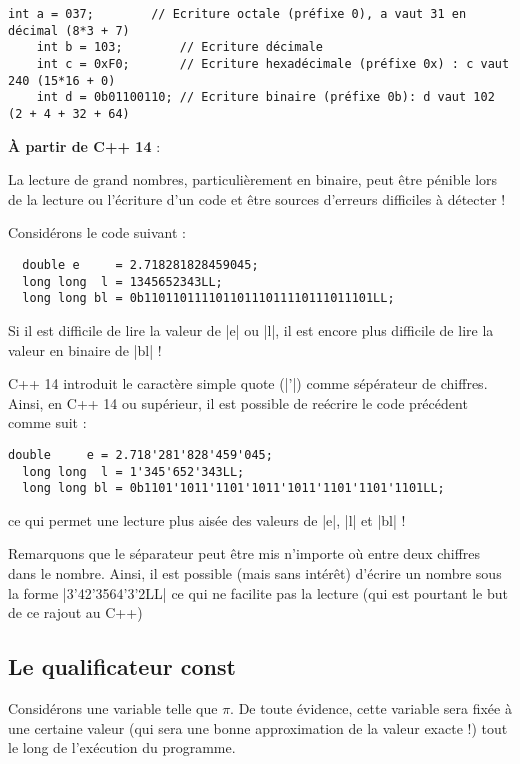 \begin{lstlisting}[caption=Ecriture binaire\, octale\, décimale et hexadécimale]
    int a = 037;        // Ecriture octale (préfixe 0), a vaut 31 en décimal (8*3 + 7)
    int b = 103;        // Ecriture décimale 
    int c = 0xF0;       // Ecriture hexadécimale (préfixe 0x) : c vaut 240 (15*16 + 0)
    int d = 0b01100110; // Ecriture binaire (préfixe 0b): d vaut 102 (2 + 4 + 32 + 64)
\end{lstlisting}

\textbf{À partir de C++ 14} :

La lecture de grand nombres, particulièrement en binaire, peut être pénible lors de la lecture ou l'écriture d'un code et
être sources d'erreurs difficiles à détecter !

Considérons le code suivant :

\begin{lstlisting}
  double e     = 2.718281828459045;
  long long  l = 1345652343LL;
  long long bl = 0b11011011110110111011110111011101LL;
\end{lstlisting}

Si il est difficile de lire la valeur de |e| ou |l|, il est encore plus difficile de lire la valeur en binaire de |bl| !

C++ 14 introduit le caractère simple quote (|'|) comme sépérateur de chiffres. Ainsi, en C++ 14 ou supérieur,
il est possible de reécrire le code précédent comme suit :

\begin{lstlisting}[caption=Ecriture avec séparateur de chiffre (C++ 14)]
  double     e = 2.718'281'828'459'045;
  long long  l = 1'345'652'343LL;
  long long bl = 0b1101'1011'1101'1011'1011'1101'1101'1101LL;
\end{lstlisting}

ce qui permet une lecture plus aisée des valeurs de |e|, |l| et |bl| !

Remarquons que le séparateur peut être mis n'importe où entre deux chiffres dans le nombre. Ainsi, il est possible (mais sans intérêt) d'écrire un nombre sous la forme |3'42'3564'3'2LL| ce qui ne facilite pas la lecture (qui est pourtant le but de ce rajout au C++)

\subsection{Le qualificateur const}

Considérons une variable telle que $\pi$. De toute évidence, cette variable sera fixée à une certaine valeur (qui sera une bonne approximation de la valeur exacte !) tout le long
de l'exécution du programme.

